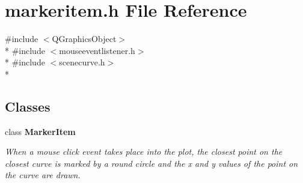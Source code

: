 \section{markeritem.\+h File Reference}
\label{bk3_2items_2markeritem_8h}
{\ttfamily \#include $<$Q\+Graphics\+Object$>$}\\*
{\ttfamily \#include $<$mouseeventlistener.\+h$>$}\\*
{\ttfamily \#include $<$scenecurve.\+h$>$}\\*
\subsection*{Classes}
\begin{DoxyCompactItemize}
\item 
class {\bf Marker\+Item}
\begin{DoxyCompactList}\small\item\em When a mouse click event takes place into the plot, the closest point on the closest curve is marked by a round circle and the x and y values of the point on the curve are drawn. \end{DoxyCompactList}\end{DoxyCompactItemize}

